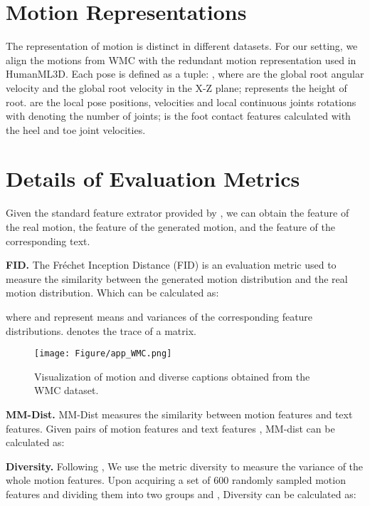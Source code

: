 \documentclass[letterpaper]{article} \usepackage{aaai24}
\begin{document}
\clearpage
\appendix
{}





\section{Motion Representations}
The representation of motion  is distinct in different datasets. For our setting, we align the motions from WMC with the redundant motion representation \cite{Peng_2021,10.1145/3528223.3530178,10.1145/3355089.3356505}
used in HumanML3D. Each pose is defined as a tuple: , where  are the global root angular velocity and the global root velocity in the X-Z plane;  represents the height of root.  are the local pose positions, velocities and local continuous joints rotations with  denoting the number of joints;  is the foot contact features calculated with the heel and toe joint velocities.


\section{Details of Evaluation Metrics}
Given the standard feature extrator provided by \cite{guo2022generating}, we can obtain the feature  of the real motion, the feature  of the generated motion, and the feature  of the corresponding text.

\noindent\textbf{FID.} The Fréchet Inception Distance (FID) is an evaluation metric used to measure the similarity between the generated motion distribution and the real motion distribution. Which can be calculated as:

where  and  represent means and variances of the corresponding feature distributions.  denotes the trace of a matrix.
\begin{figure}[t] 
\texttt{[image: Figure/app\_WMC.png]} 
	\caption{Visualization of motion and diverse captions obtained from the WMC dataset.}
	\label{Fig:app_WMC} 
\end{figure}


\noindent\textbf{MM-Dist.} MM-Dist measures the similarity between motion features and text features. Given  pairs of motion features  and text features , MM-dist can be calculated as:



\noindent\textbf{Diversity.} Following \cite{guo2022generating}, We use the metric diversity to measure the variance of the whole motion features. Upon acquiring a set of 600 randomly sampled motion features and dividing them into two groups  and , Diversity can be calculated as:
\end{document}
